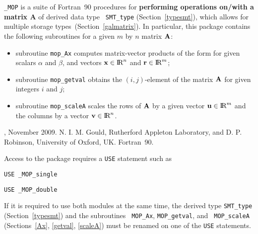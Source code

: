 \documentclass{galahad}
\newcommand{\packagename}{MOP}
\newcommand{\fullpackagename}{\libraryname\_\packagename}
\begin{document}
\galheader


\galsummary

{\tt \fullpackagename} is a suite of Fortran~90 procedures for
{\bf performing operations on/with a matrix $\mathbf{A}$} of derived data type {\tt
  SMT\_type} (Section~\ref{typesmt}), which allows for multiple storage
types~(Section~\ref{galmatrix}).  In particular, this package contains the following
subroutines for a given $m$ by $n$ matrix ${\mathbf{A}}$:
\begin{itemize}
  \item subroutine {\tt mop\_Ax} computes matrix-vector products of
    the form
    for given scalars $\alpha$ and $\beta$, and vectors ${\mathbf{x}}
    \in \hbox{I\hskip -1.5pt R}^n$ and ${\mathbf{r}} \in \hbox{I\hskip -1.5pt R}^m$;
  \item subroutine {\tt mop\_getval} obtains the $(i,j)$-element of
    the matrix ${\mathbf{A}}$ for given integers $i$ and $j$;
  \item subroutine {\tt mop\_scaleA} scales the rows of ${\mathbf{A}}$ by a
    given vector ${\mathbf{u}}\in\hbox{I\hskip -1.5pt R}^m$ and the columns by a vector ${\mathbf{v}}\in\hbox{I\hskip -1.5pt R}^n$.
\end{itemize}


\galattributes
\galversions{\tt  \fullpackagename\_single, \fullpackagename\_double},
\galdate November 2009.
\galorigin N. I. M. Gould, Rutherford Appleton Laboratory, and
D. P. Robinson, University of Oxford, UK.
\gallanguage Fortran~90.


\galhowto

Access to the package requires a {\tt USE} statement such as

\medskip{}

\hspace{8mm} {\tt USE \fullpackagename\_single}

\medskip{}

\hspace{8mm} {\tt USE  \fullpackagename\_double}

\medskip

If it is required to use both modules at the same time, the derived
type {\tt SMT\_type} (Section~\ref{typesmt}) and the subroutines {\tt
  \packagename\_Ax}, {\tt \packagename\_getval}, and {\tt
  \packagename\_scaleA} (Sections~\ref{Ax}, \ref{getval},
\ref{scaleA}) must be renamed on one of the {\tt USE} statements.
\end{document}
